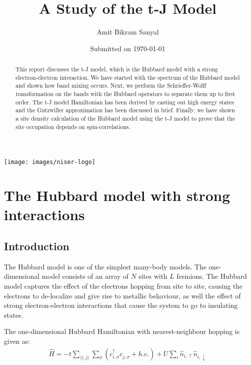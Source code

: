 \documentclass[]{report}
\title{A Study of the t-J Model\vspace{-5mm}}
\author{Amit Bikram Sanyal}
\date{Submitted on \today}
\begin{document}
	
\begin{minipage}{\linewidth}
	\maketitle
\end{minipage}

\vfill

\begin{center}
	\texttt{[image: images/niser-logo]}
\end{center}


\newpage
\tableofcontents
\thispagestyle{empty}

\begin{abstract}
This report discusses the t-J model, which is the Hubbard model with a strong electron-electron interaction. We have started with the spectrum of the Hubbard model and shown how band mixing occurs. Next, we perform the Schrieffer-Wolff transformation on the bands with the Hubbard operators to separate them up to first order. The t-J model Hamiltonian has been derived by casting out high energy states and the Gutzwiller approximation has been discussed in brief. Finally, we have shown a site density calculation of the Hubbard model using the t-J model to prove that the site occupation depends on spin-correlations.
\end{abstract}

\chapter{The Hubbard model with strong interactions}
\section{Introduction}
The Hubbard model is one of the simplest many-body models. The one-dimensional model consists of an array of $ N $ sites with $ L $ fermions. The Hubbard model captures the effect of the electrons hopping from site to site, causing the electrons to de-localize and give rise to metallic behaviour, as well the effect of strong electron-electron interactions that cause the system to go to insulating states.

The one-dimensional Hubbard Hamiltonian with nearest-neighbour hopping is given as:
\begin{align}
	\hat{H} = -t \sum_{\langle i, j \rangle } \sum_{\sigma} \left( c^{\dagger}_{i, \sigma} c^{}_{j, \sigma} + h.c. \right) + U \sum_{i} \hat{n}_{i, \uparrow} \hat{n}_{i, \downarrow}
\end{align}
\end{document}

